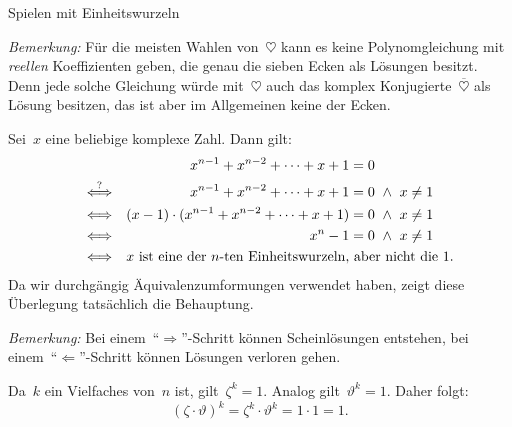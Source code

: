 \documentclass{algblatt}
\begin{document}
\begin{aufgabe}{Spielen mit Einheitswurzeln}
\begin{loesungE}
\emph{Bemerkung:} Für die meisten Wahlen von~$\heartsuit$ kann es keine
Polynomgleichung mit \emph{reellen} Koeffizienten geben, die genau die sieben
Ecken als Lösungen besitzt. Denn jede solche Gleichung würde mit~$\heartsuit$
auch das komplex Konjugierte~$\overline{\heartsuit}$ als Lösung besitzen, das
ist aber im Allgemeinen keine der Ecken.

\item Sei~$x$ eine beliebige komplexe Zahl. Dann gilt:
\begin{align*}
  && x^{n-1} + x^{n-2} + \cdots + x + 1 &= 0 \\
  \stackrel{?}{\Longleftrightarrow} &&
    x^{n-1} + x^{n-2} + \cdots + x + 1 &= 0 \ \wedge\  x \neq 1 \\
  \Longleftrightarrow &&
    (x - 1) \cdot (x^{n-1} + x^{n-2} + \cdots + x + 1) &= 0 \ \wedge\  x \neq 1 \\
  \Longleftrightarrow &&
    x^n - 1 &= 0 \ \wedge\  x \neq 1 \\
  \Longleftrightarrow &&
    \omit\rlap{\text{$x$ ist eine der~$n$-ten Einheitswurzeln, aber nicht
    die~$1$.}}
\end{align*}
Da wir durchgängig Äquivalenzumformungen verwendet haben, zeigt diese
Überlegung tatsächlich die Behauptung.

\emph{Bemerkung:} Bei einem~"`$\Rightarrow$"'-Schritt können Scheinlösungen
entstehen, bei einem~"`$\Leftarrow$"'-Schritt können Lösungen verloren gehen.

\item Da~$k$ ein Vielfaches von~$n$ ist, gilt~$\zeta^k = 1$. Analog
gilt~$\vartheta^k = 1$. Daher folgt:
\[ (\zeta \cdot \vartheta)^k = \zeta^k \cdot \vartheta^k = 1 \cdot 1 = 1. \]
\end{loesungE}
\end{aufgabe}
\end{document}
